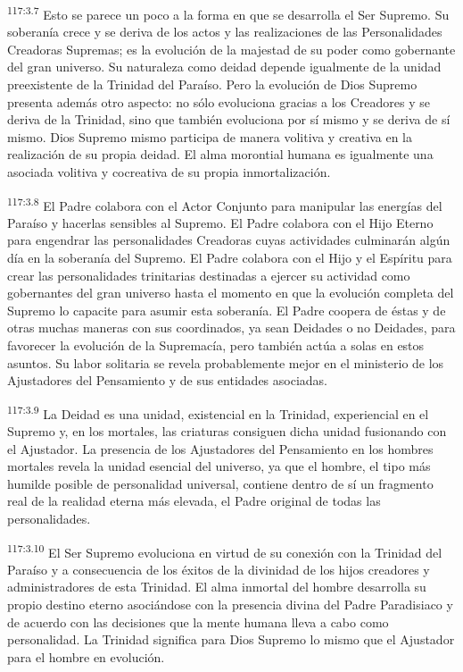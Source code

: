 \documentclass[twoside, 11pt]{book}
\begin{document}
\par
\textsuperscript{117:3.7} Esto se parece un poco a la forma en que se desarrolla el Ser Supremo. Su soberanía crece y se deriva de los actos y las realizaciones de las Personalidades Creadoras Supremas; es la evolución de la majestad de su poder como gobernante del gran universo. Su naturaleza como deidad depende igualmente de la unidad preexistente de la Trinidad del Paraíso. Pero la evolución de Dios Supremo presenta además otro aspecto: no sólo evoluciona gracias a los Creadores y se deriva de la Trinidad, sino que también evoluciona por sí mismo y se deriva de sí mismo. Dios Supremo mismo participa de manera volitiva y creativa en la realización de su propia deidad. El alma morontial humana es igualmente una asociada volitiva y cocreativa de su propia inmortalización.

\par
\textsuperscript{117:3.8} El Padre colabora con el Actor Conjunto para manipular las energías del Paraíso y hacerlas sensibles al Supremo. El Padre colabora con el Hijo Eterno para engendrar las personalidades Creadoras cuyas actividades culminarán algún día en la soberanía del Supremo. El Padre colabora con el Hijo y el Espíritu para crear las personalidades trinitarias destinadas a ejercer su actividad como gobernantes del gran universo hasta el momento en que la evolución completa del Supremo lo capacite para asumir esta soberanía. El Padre coopera de éstas y de otras muchas maneras con sus coordinados, ya sean Deidades o no Deidades, para favorecer la evolución de la Supremacía, pero también actúa a solas en estos asuntos. Su labor solitaria se revela probablemente mejor en el ministerio de los Ajustadores del Pensamiento y de sus entidades asociadas.

\par
\textsuperscript{117:3.9} La Deidad es una unidad, existencial en la Trinidad, experiencial en el Supremo y, en los mortales, las criaturas consiguen dicha unidad fusionando con el Ajustador. La presencia de los Ajustadores del Pensamiento en los hombres mortales revela la unidad esencial del universo, ya que el hombre, el tipo más humilde posible de personalidad universal, contiene dentro de sí un fragmento real de la realidad eterna más elevada, el Padre original de todas las personalidades.

\par
\textsuperscript{117:3.10} El Ser Supremo evoluciona en virtud de su conexión con la Trinidad del Paraíso y a consecuencia de los éxitos de la divinidad de los hijos creadores y administradores de esta Trinidad. El alma inmortal del hombre desarrolla su propio destino eterno asociándose con la presencia divina del Padre Paradisiaco y de acuerdo con las decisiones que la mente humana lleva a cabo como personalidad. La Trinidad significa para Dios Supremo lo mismo que el Ajustador para el hombre en evolución.
\end{document}

